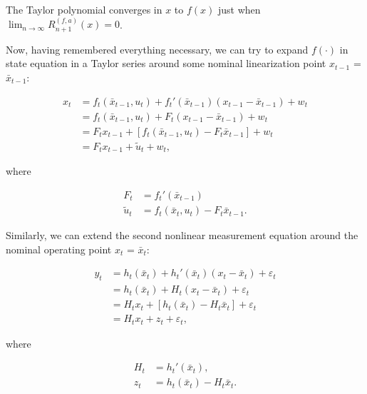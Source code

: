 The Taylor polynomial converges in $x$ to $f(x)$ just when \(\lim_{n\to\infty} R_{n+1}^{(f,a)}(x)=0\).

Now, having remembered everything necessary, we can try to expand \(f(\cdot)\) in state equation in a Taylor series around some nominal linearization point \(x_{t-1}\) = \(\bar{x}_{t-1}\):

\begin{equation}
\begin{aligned}
x_t 
&= 
f_t\left(\bar{x}_{t-1}, u_t\right) +
f_{t}'(\bar{x}_{t-1})
\left( x_{t-1} - \bar{x}_{t-1}\right) +
w_t \\
&=
f_t\left(\bar{x}_{t-1}, u_t\right) +
F_{t}\left(x_{t-1} - \bar{x}_{t-1}\right) +
w_t \\
&=
F_t x_{t-1} + \left[ f_t\left(\bar{x}_{t-1}, u_t\right) - F_t \bar{x}_{t-1} \right] + w_t \\
&=
F_t x_{t-1} + \tilde{u}_t + w_t,
\label{eq:measurement_equation_linearization}
\end{aligned}
\end{equation}

\noindent where

\begin{subequations}
\begin{align*}
F_t&=f_t'(\bar{x}_{t-1}) \\
\tilde{u}_t &= f_t\left(\bar{x}_t, u_t\right) - F_t \bar{x}_{t-1}.
\end{align*}
\end{subequations}

Similarly, we can extend the second nonlinear measurement equation around the nominal operating point \(x_t\) = \(\bar{x}_t\):

\begin{equation}
\begin{aligned}
y_t 
&=
h_t \left(\bar{x}_t\right) + h_t'(\bar{x}_t) \left( x_t - \bar{x}_t \right) + \varepsilon_t \\
&=
h_t \left(\bar{x}_t\right) + H_t\left(x_t - \bar{x}_t \right) + \varepsilon_t \\
&=
H_t x_t + \left[ h_t \left(\bar{x}_t\right) - H_t \bar{x}_t \right] + \varepsilon_t \\
&=
H_t x_t + z_t + \varepsilon_t,
\end{aligned}
\end{equation}

\noindent where

\begin{subequations}
\begin{align*}
H_t &= h_t'(\bar{x}_t), \\
z_t &= h_t \left(\bar{x}_t\right) - H_t \bar{x}_t.
\end{align*}
\end{subequations}

